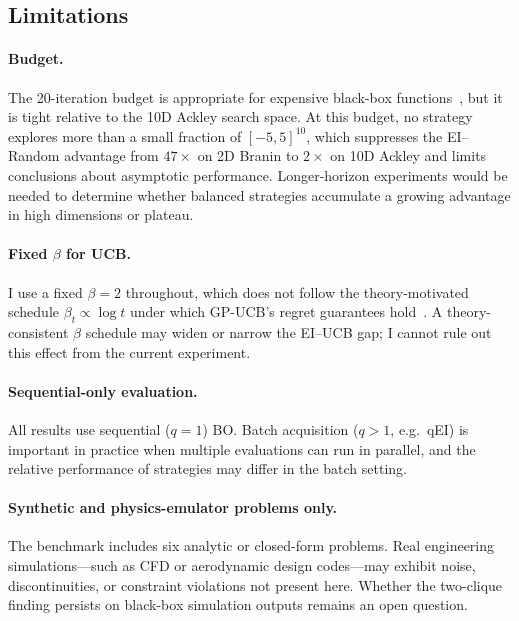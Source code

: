 \subsection{Limitations}
\label{sec:limitations}

\paragraph{Budget.}
The 20-iteration budget is appropriate for expensive black-box
functions~\citep{frazier2018tutorial}, but it is tight relative to the
10D Ackley search space.
At this budget, no strategy explores more than a small fraction of
$[-5, 5]^{10}$, which suppresses the EI–Random advantage from $47\times$
on 2D Branin to $2\times$ on 10D Ackley and limits conclusions about
asymptotic performance.
Longer-horizon experiments would be needed to determine whether
balanced strategies accumulate a growing advantage in high dimensions
or plateau.

\paragraph{Fixed $\beta$ for UCB.}
I use a fixed $\beta = 2$ throughout, which does not follow the
theory-motivated schedule $\beta_t \propto \log t$ under which GP-UCB's
regret guarantees hold~\citep{frazier2018tutorial}.
A theory-consistent $\beta$ schedule may widen or narrow the EI–UCB gap;
I cannot rule out this effect from the current experiment.

\paragraph{Sequential-only evaluation.}
All results use sequential ($q = 1$) BO.
Batch acquisition ($q > 1$, e.g.\ qEI) is important in practice when
multiple evaluations can run in parallel, and the relative performance of
strategies may differ in the batch setting.

\paragraph{Synthetic and physics-emulator problems only.}
The benchmark includes six analytic or closed-form problems.
Real engineering simulations—such as CFD or aerodynamic design codes—may
exhibit noise, discontinuities, or constraint violations not present
here.
Whether the two-clique finding persists on black-box simulation outputs
remains an open question.

